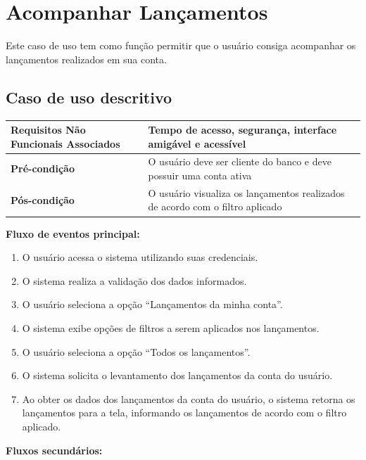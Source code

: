 \section{Acompanhar Lançamentos}

Este caso de uso tem como função permitir que o usuário consiga acompanhar os lançamentos realizados em sua conta.

\subsection{Caso de uso descritivo}

\begin{table}[h]
  \centering
  \begin{tabular}{|p{4cm} | p{10cm} |}
      \hline
      \small{\textbf{Requisitos Não Funcionais Associados}}	&	Tempo de acesso, segurança, interface amigável e acessível	\\ \hline
      \small{\textbf{Pré-condição}}	&	O usuário deve ser cliente do banco e deve possuir uma conta ativa	\\ \hline
      \small{\textbf{Pós-condição}}	&	O usuário visualiza os lançamentos realizados de acordo com o filtro aplicado	\\ \hline
    \end{tabular}
\end{table}

\textbf{Fluxo de eventos principal:}

\begin{enumerate}
  \item O usuário acessa o sistema utilizando suas credenciais.
  \item O sistema realiza a validação dos dados informados.
  \item O usuário seleciona a opção ``Lançamentos da minha conta''.
  \item O sistema exibe opções de filtros a serem aplicados nos lançamentos.
  \item O usuário seleciona a opção ``Todos os lançamentos''.
  \item O sistema solicita o levantamento dos lançamentos da conta do usuário.
  \item Ao obter os dados dos lançamentos da conta do usuário, o sistema retorna os lançamentos para a tela, informando os lançamentos de acordo com o filtro aplicado.
\end{enumerate}

\textbf{Fluxos secundários:}

